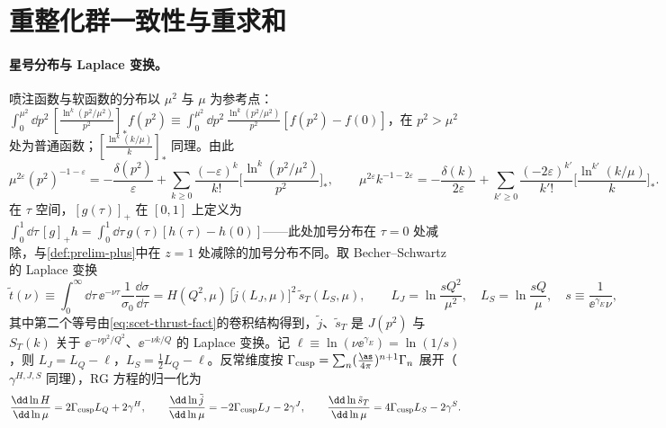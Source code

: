 \section{重整化群一致性与重求和}\label{sec:scet-rg}

\paragraph{星号分布与 Laplace 变换。}
喷注函数与软函数的分布以 $\mu^2$ 与 $\mu$ 为参考点：
$\int_0^{\mu^2}\dd p^2\,[\frac{\ln^k(p^2/\mu^2)}{p^2}]_*f(p^2)\equiv\int_0^{\mu^2}\dd p^2\,\frac{\ln^k(p^2/\mu^2)}{p^2}[f(p^2)-f(0)]$，在 $p^2>\mu^2$ 处为普通函数；$[\frac{\ln^k(k/\mu)}{k}]_*$ 同理。由此
\begin{equation}\label{eq:scet-distid}
\mu^{2\varepsilon}(p^2)^{-1-\varepsilon}=-\frac{\delta(p^2)}{\varepsilon}+\sum_{k\ge0}\frac{(-\varepsilon)^k}{k!}\Big[\frac{\ln^k(p^2/\mu^2)}{p^2}\Big]_*,\qquad
\mu^{2\varepsilon}k^{-1-2\varepsilon}=-\frac{\delta(k)}{2\varepsilon}+\sum_{k'\ge0}\frac{(-2\varepsilon)^{k'}}{k'!}\Big[\frac{\ln^{k'}(k/\mu)}{k}\Big]_* .
\end{equation}
在 $\tau$ 空间，$[g(\tau)]_+$ 在 $[0,1]$ 上定义为 $\int_0^1\dd\tau\,[g]_+h=\int_0^1\dd\tau\,g(\tau)[h(\tau)-h(0)]$——此处加号分布在 $\tau=0$ 处减除，与\cref{def:prelim-plus}中在 $z=1$ 处减除的加号分布不同。取 Becher--Schwartz 的 Laplace 变换\cite[附录~B]{BecherSchwartz2008}
\begin{equation}\label{eq:scet-laplace}
\tilde t(\nu)\equiv\int_0^\infty\dd\tau\,\ee^{-\nu\tau}\frac{1}{\sigma_0}\frac{\dd\sigma}{\dd\tau}=H(Q^2,\mu)\,\big[\tilde j(L_J,\mu)\big]^2\,\tilde s_T(L_S,\mu),\qquad
L_J=\ln\frac{sQ^2}{\mu^2},\quad L_S=\ln\frac{sQ}{\mu},\quad s\equiv\frac{1}{\ee^{\gamma_E}\nu},
\end{equation}
其中第二个等号由\cref{eq:scet-thrust-fact}的卷积结构得到，$\tilde j$、$\tilde s_T$ 是 $J(p^2)$ 与 $S_T(k)$ 关于 $\ee^{-\nu p^2/Q^2}$、$\ee^{-\nu k/Q}$ 的 Laplace 变换。记 $\ell\equiv\ln(\nu\ee^{\gamma_E})=\ln(1/s)$，则 $L_J=L_Q-\ell$，$L_S=\frac12L_Q-\ell$。反常维度按 $\Gamma_{\rm cusp}=\sum_n(\frac{\as}{4\pi})^{n+1}\Gamma_n$ 展开（$\gamma^{H,J,S}$ 同理），RG 方程的归一化为
\begin{equation}\label{eq:scet-RGE}
\frac{\dd\ln H}{\dd\ln\mu}=2\Gamma_{\rm cusp}L_Q+2\gamma^H,\qquad
\frac{\dd\ln\tilde j}{\dd\ln\mu}=-2\Gamma_{\rm cusp}L_J-2\gamma^J,\qquad
\frac{\dd\ln\tilde s_T}{\dd\ln\mu}=4\Gamma_{\rm cusp}L_S-2\gamma^S .
\end{equation}

